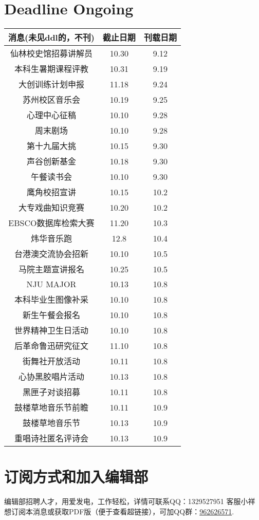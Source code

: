 \documentclass[letterpaper, 12pt]{article}
\begin{document}
\begin{multicols}{2}
\section{Deadline Ongoing}
\begin{tabular}{|c|c|c|}
    \hline
    消息(未见ddl的，不刊) & 截止日期 & 刊载日期\\
    \hline\hline
    仙林校史馆招募讲解员 & 10.30 & 9.12\\
    本科生暑期课程评教 & 10.31 & 9.19\\
    大创训练计划申报 & 11.18 & 9.24\\
    苏州校区音乐会 & 10.19 & 9.25\\
    心理中心征稿 & 10.10 & 9.28\\
    周末剧场 & 10.10 & 9.28\\
    第十九届大挑 & 10.15 & 9.30\\
    声谷创新基金 & 10.18 & 9.30\\
    午餐读书会 & 10.10 & 9.30\\
    鹰角校招宣讲 & 10.15 & 10.2\\
    大专戏曲知识竞赛 & 10.20 & 10.2\\
    EBSCO数据库检索大赛 & 11.20 & 10.3\\
    炜华音乐跑 & 12.8 & 10.4\\
    台港澳交流协会招新 & 10.10 & 10.5\\
    马院主题宣讲报名 & 10.25 & 10.5\\
    NJU MAJOR & 10.13 & 10.8\\
    本科毕业生图像补采 & 10.10 & 10.8\\
    新生午餐会报名 & 10.10 & 10.8\\
    世界精神卫生日活动 & 10.10 & 10.8\\
    后革命鲁迅研究征文 & 11.10 & 10.8\\
    街舞社开放活动 & 10.11 & 10.8\\
    心协黑胶唱片活动 & 10.13 & 10.8\\
    黑匣子对谈招募 & 10.11 & 10.8\\
    鼓楼草地音乐节前瞻 & 10.11 & 10.9\\
    鼓楼草地音乐节 & 10.13 & 10.9\\
    重唱诗社匿名评诗会 & 10.13 & 10.9\\
    \hline
\end{tabular}
\section{订阅方式和加入编辑部}
编辑部招聘人才，用爱发电，工作轻松，详情可联系QQ：1329527951 客服小祥\\想订阅本消息或获取PDF版（便于查看超链接），可加QQ群：\href{https://qm.qq.com/q/FGX1VYCrGS}{962626571}.

\end{multicols}
\end{document}
